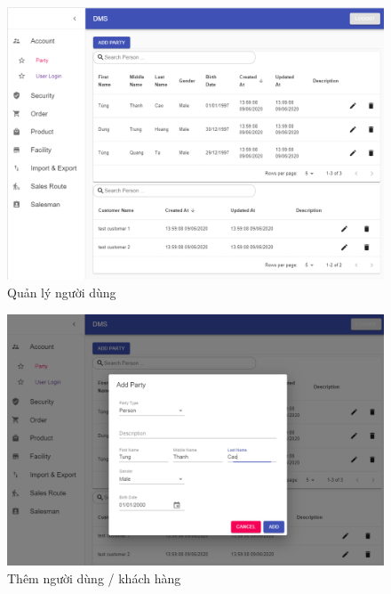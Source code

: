 \begin{figure}[H]
\centering
\includegraphics[width=15cm]{images/demo/party-manage.png}
\caption{Quản lý người dùng}
\end{figure}

\begin{figure}[H]
\centering
\includegraphics[width=15cm]{images/demo/add-party.png}
\caption{Thêm người dùng / khách hàng}
\end{figure}

